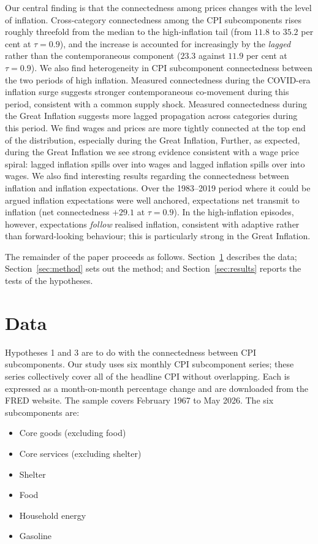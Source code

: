 \documentclass{article}
\begin{document}
Our central finding is that the connectedness among prices changes with the
level of inflation. Cross-category connectedness among the CPI subcomponents rises
roughly threefold from the median to the high-inflation tail (from $11.8$ to $35.2$
per cent at $\tau=0.9$), and the increase is accounted for increasingly by the
\emph{lagged} rather than the contemporaneous component ($23.3$ against $11.9$ per
cent at $\tau=0.9$). We also find heterogeneity in  CPI subcomponent connectedness between the two periods of high inflation. Measured connectedness during the COVID-era inflation surge suggests stronger contemporaneous co-movement during this period, consistent with a common supply shock. Measured connectedness during the Great Inflation suggests more lagged propagation across categories during this period. We find wages and prices are more tightly connected at the top end of the distribution, especially during the Great Inflation,  Further, as expected, during the Great Inflation we see strong evidence consistent with a wage price spiral: lagged inflation spills over into wages and lagged inflation spills over into wages. We also find interesting results regarding the connectedness between inflation and inflation expectations.  Over the 1983--2019 period where it could be argued inflation expectations were well anchored, expectations net transmit to inflation (net
connectedness $+29.1$ at $\tau=0.9$). In the high-inflation episodes, however, expectations \emph{follow}
realised inflation, consistent with adaptive rather than forward-looking behaviour; this is particularly strong in the Great Inflation.

The remainder of the paper proceeds as follows.
Section~\ref{sec:data} describes the data; Section~\ref{sec:method} sets out the method; and
Section~\ref{sec:results} reports the tests of the hypotheses.

\section{Data}\label{sec:data}

Hypotheses 1 and 3 are to do with the connectedness between CPI subcomponents. Our study uses six monthly CPI subcomponent series; these series collectively  
cover all of the
headline CPI without overlapping. Each is expressed as a month-on-month percentage change and are downloaded from the FRED website. The sample covers
February 1967 to May 2026. The six subcomponents are:
\begin{itemize}
    \item Core goods (excluding food)
    \item Core services (excluding shelter)
    \item Shelter
    \item Food
    \item Household energy
    \item Gasoline
\end{itemize}
\end{document}
